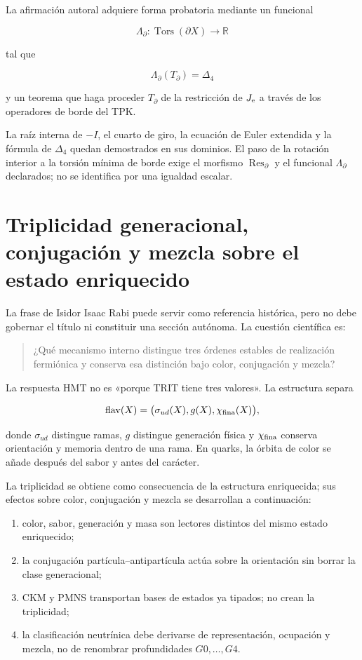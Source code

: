 La afirmación autoral adquiere forma probatoria mediante un funcional

\[
\Lambda_\partial:
\operatorname{Tors}(\partial X)
\longrightarrow\mathbb R
\]

tal que

\[
\Lambda_\partial(T_\partial)=\Delta_4
\]

y un teorema que haga proceder \(T_\partial\) de la restricción de \(J_{\rm e}\) a través de los operadores de borde del TPK.

La raíz interna de \(-I\), el cuarto de giro, la ecuación de Euler extendida y la fórmula de \(\Delta_4\) quedan demostrados en sus dominios. El paso de la rotación interior a la torsión mínima de borde exige el morfismo \(\operatorname{Res}_{\partial}\) y el funcional \(\Lambda_{\partial}\) declarados; no se identifica por una igualdad escalar.


\section{Triplicidad generacional, conjugación y mezcla sobre el estado enriquecido}

La frase de Isidor Isaac Rabi puede servir como referencia histórica, pero no debe gobernar el título ni constituir una sección autónoma. La cuestión científica es:

\begin{quote}
¿Qué mecanismo interno distingue tres órdenes estables de realización fermiónica y conserva esa distinción bajo color, conjugación y mezcla?
\end{quote}

La respuesta HMT no es «porque TRIT tiene tres valores». La estructura separa

\[
\operatorname{flav}(X)
=\bigl(\sigma_{ud}(X),g(X),\chi_{\rm fina}(X)\bigr),
\]

donde \(\sigma_{ud}\) distingue ramas, \(g\) distingue generación física y \(\chi_{\rm fina}\) conserva orientación y memoria dentro de una rama. En quarks, la órbita de color se añade después del sabor y antes del carácter.

La triplicidad se obtiene como consecuencia de la estructura enriquecida; sus efectos sobre color, conjugación y mezcla se desarrollan a continuación:

\begin{enumerate}
\item color, sabor, generación y masa son lectores distintos del mismo estado enriquecido;
\item la conjugación partícula–antipartícula actúa sobre la orientación sin borrar la clase generacional;
\item CKM y PMNS transportan bases de estados ya tipados; no crean la triplicidad;
\item la clasificación neutrínica debe derivarse de representación, ocupación y mezcla, no de renombrar profundidades \(G0,\ldots,G4\).
\end{enumerate}

